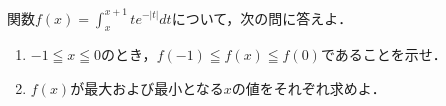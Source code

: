 \documentclass[../../main.tex]{subfiles}
\begin{document}
関数$\displaystyle f(x)=\int_x^{x+1}te^{-|t|}dt$について，次の問に答えよ．
\begin{enumerate}
  \item $-1\leqq x \leqq0$のとき，$f(-1)\leqq f(x) \leqq f(0)$であることを示せ．
  \item $f(x)$が最大および最小となる$x$の値をそれぞれ求めよ．
\end{enumerate}
\end{document}
